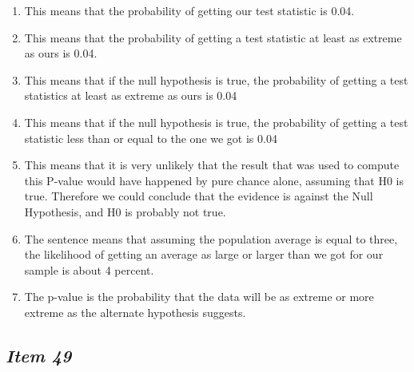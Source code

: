 \begin{enumerate} [leftmargin=1cm, itemsep=.2em]


\item This means that the probability of getting our test statistic is 0.04.





\item This means that the probability of getting a test statistic at least as extreme as ours is 0.04.





\item This means that if the null hypothesis is true, the probability of getting a test statistics at least as extreme as ours is 0.04





\item This means that if the null hypothesis is true, the probability of getting a test statistic less than or equal to the one we got is 0.04





\item This means that it is very unlikely that the result that was used to compute this P-value would have happened by pure chance alone, assuming that H0 is true. Therefore we could conclude that the evidence is against the Null Hypothesis, and H0 is probably not true.





\item The sentence means that assuming the population average is equal to three, the likelihood of getting an average as large or larger than we got for our sample is about 4 percent. 





\item The p-value is the probability that the data will be as extreme or more extreme as the alternate hypothesis suggests.


\end{enumerate}








\subsection{\textbf{\textit{Item 49}}}





